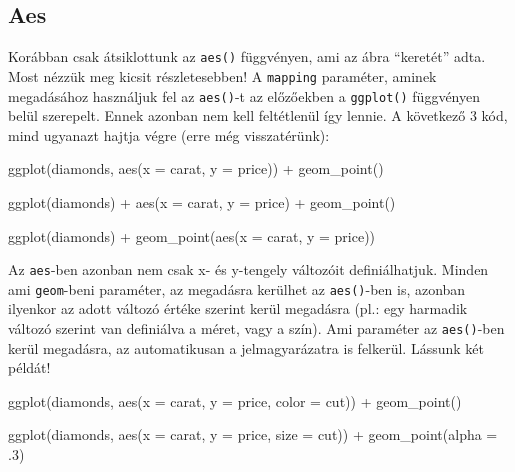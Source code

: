 \documentclass[
]{article}
\newenvironment{Shaded}{\begin{snugshade}}{\end{snugshade}}
\newcommand{\AttributeTok}[1]{\textcolor[rgb]{0.77,0.63,0.00}{#1}}
\newcommand{\DecValTok}[1]{\textcolor[rgb]{0.00,0.00,0.81}{#1}}
\newcommand{\FunctionTok}[1]{\textcolor[rgb]{0.00,0.00,0.00}{#1}}
\newcommand{\NormalTok}[1]{#1}
\newcommand{\SpecialCharTok}[1]{\textcolor[rgb]{0.00,0.00,0.00}{#1}}
\begin{document}
\hypertarget{aes}{%
\subsection{Aes}\label{aes}}

Korábban csak átsiklottunk az \texttt{aes()} függvényen, ami az ábra ``keretét'' adta. Most nézzük meg kicsit részletesebben! A \texttt{mapping} paraméter, aminek megadásához használjuk fel az \texttt{aes()}-t az előzőekben a \texttt{ggplot()} függvényen belül szerepelt. Ennek azonban nem kell feltétlenül így lennie. A következő 3 kód, mind ugyanazt hajtja végre (erre még visszatérünk):

\begin{Shaded}
\begin{Highlighting}[]
\FunctionTok{ggplot}\NormalTok{(diamonds, }\FunctionTok{aes}\NormalTok{(}\AttributeTok{x =}\NormalTok{ carat, }\AttributeTok{y =}\NormalTok{ price)) }\SpecialCharTok{+}
  \FunctionTok{geom\_point}\NormalTok{()}

\FunctionTok{ggplot}\NormalTok{(diamonds) }\SpecialCharTok{+}
  \FunctionTok{aes}\NormalTok{(}\AttributeTok{x =}\NormalTok{ carat, }\AttributeTok{y =}\NormalTok{ price) }\SpecialCharTok{+}
  \FunctionTok{geom\_point}\NormalTok{()}

\FunctionTok{ggplot}\NormalTok{(diamonds) }\SpecialCharTok{+}
  \FunctionTok{geom\_point}\NormalTok{(}\FunctionTok{aes}\NormalTok{(}\AttributeTok{x =}\NormalTok{ carat, }\AttributeTok{y =}\NormalTok{ price))}
\end{Highlighting}
\end{Shaded}

Az \texttt{aes}-ben azonban nem csak x- és y-tengely változóit definiálhatjuk. Minden ami \texttt{geom}-beni paraméter, az megadásra kerülhet az \texttt{aes()}-ben is, azonban ilyenkor az adott változó értéke szerint kerül megadásra (pl.: egy harmadik változó szerint van definiálva a méret, vagy a szín). Ami paraméter az \texttt{aes()}-ben kerül megadásra, az automatikusan a jelmagyarázatra is felkerül. Lássunk két példát!

\begin{Shaded}
\begin{Highlighting}[]
\FunctionTok{ggplot}\NormalTok{(diamonds, }\FunctionTok{aes}\NormalTok{(}\AttributeTok{x =}\NormalTok{ carat, }\AttributeTok{y =}\NormalTok{ price, }\AttributeTok{color =}\NormalTok{ cut)) }\SpecialCharTok{+}
  \FunctionTok{geom\_point}\NormalTok{()}

\FunctionTok{ggplot}\NormalTok{(diamonds, }\FunctionTok{aes}\NormalTok{(}\AttributeTok{x =}\NormalTok{ carat, }\AttributeTok{y =}\NormalTok{ price, }\AttributeTok{size =}\NormalTok{ cut)) }\SpecialCharTok{+}
  \FunctionTok{geom\_point}\NormalTok{(}\AttributeTok{alpha =}\NormalTok{ .}\DecValTok{3}\NormalTok{)}
\end{Highlighting}
\end{Shaded}
\end{document}
